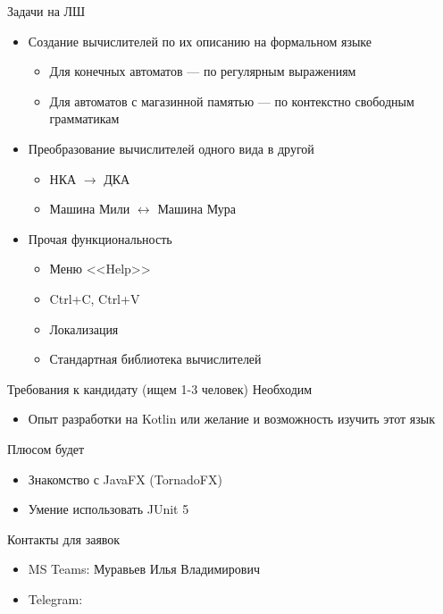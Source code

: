 \documentclass[xetex,mathserif,serif]{beamer}
\begin{document}
        \begin{frame}{Задачи на ЛШ}
            \begin{itemize}
                \item Создание вычислителей по их описанию на формальном языке
                \begin{itemize}
                    \item Для конечных автоматов --- по регулярным выражениям
                    \item Для автоматов с магазинной памятью --- по контекстно свободным грамматикам
                \end{itemize}
                \item Преобразование вычислителей одного вида в другой
                \begin{itemize}
                    \item НКА $\longrightarrow$ ДКА
                    \item Машина Мили $\longleftrightarrow$ Машина Мура
                \end{itemize}
                \item Прочая функциональность
                    \begin{itemize}
                        \item Меню <<Help>>
                        \item Ctrl+C, Ctrl+V
                        \item Локализация
                        \item Стандартная библиотека вычислителей
                    \end{itemize}
            \end{itemize}
        \end{frame}
        
        \begin{frame}{Требования к кандидату (ищем 1-3 человек)}
            Необходим
            \begin{itemize}
                \item Опыт разработки на Kotlin или желание и возможность изучить этот язык
            \end{itemize}
            \vspace{10pt}
            Плюсом будет
            \begin{itemize}
                \item Знакомство с JavaFX (TornadoFX)
                \item Умение использовать JUnit 5
            \end{itemize}
        \end{frame}
        
        \begin{frame}{Контакты для заявок}
            \begin{itemize}
                \item MS Teams: Муравьев Илья Владимирович
                \item Telegram: \href{https://t.me/ilyamuravjov}{\color{blue}{@ilyamuravjov}}
            \end{itemize}
        \end{frame}
\end{document}
